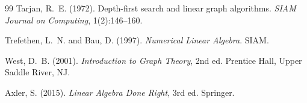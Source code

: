 ﻿\documentclass[12pt, a4paper]{article}
\theoremstyle{definition}
\theoremstyle{remark}
\begin{document}
\begin{thebibliography}{99}
	Tarjan, R.~E. (1972).
	\newblock Depth-first search and linear graph algorithms.
	\newblock \textit{SIAM Journal on Computing}, 1(2):146--160.
	
	Trefethen, L.~N. and Bau, D. (1997).
	\newblock \textit{Numerical Linear Algebra}.
	\newblock SIAM.
	
	West, D.~B. (2001).
	\newblock \textit{Introduction to Graph Theory}, 2nd ed.
	\newblock Prentice Hall, Upper Saddle River, NJ.
	
	Axler, S. (2015).
	\newblock \textit{Linear Algebra Done Right}, 3rd ed.
	\newblock Springer.
	
\end{thebibliography}
\end{document}
